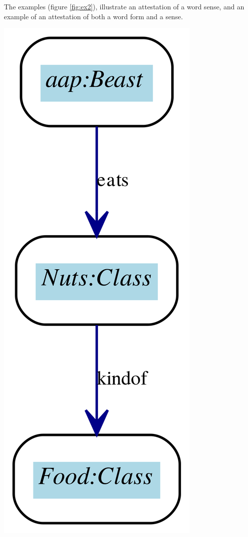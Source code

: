 \documentclass[10pt]{article}
\begin{document}
 The examples (figure \ref{fig:ex2}), illustrate an attestation of a word sense, and an example of an attestation of both a word form and a sense.\par

\includegraphics[width=\textwidth]{voorbeeld1.pdf}
\end{document}
